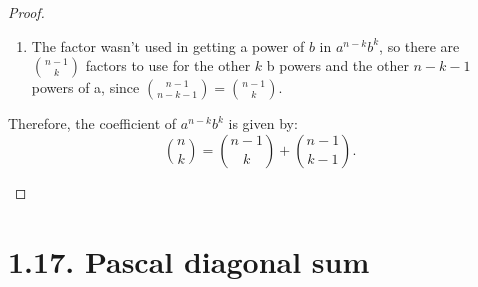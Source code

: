 \begin{proof}
\begin{enumerate}[(a)]
\begin{enumerate}
            \item The factor wasn't used in getting a power of $b$ in $a^{n - k}b^k$, so there are 
                $\binom{n - 1}{k}$ factors to use for the other $k$ b powers and the other $n - k - 1$ 
                powers of a, since $\binom{n - 1}{n - k - 1} = \binom{n - 1}{k}$.
        \end{enumerate}

    Therefore, the coefficient of $a^{n-k}b^k$ is given by:
    \[
        \binom{n}{k} = \binom{n - 1}{k} + \binom{n - 1}{k - 1}
    .\] 
    \end{enumerate}
\end{proof}

\section*{1.17. Pascal diagonal sum}
